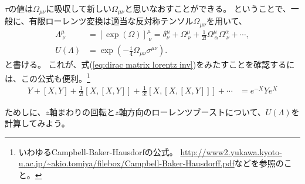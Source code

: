 \documentclass[10pt,a4paper]{jarticle}
\begin{document}
$\tau$の値は$\Omega_{\mu\nu}$に吸収して新しい$\Omega_{\mu\nu}$と思いなおすことができる。
ということで、一般に、有限ローレンツ変換は適当な反対称テンソル$\Omega_{\mu\nu}$を用いて、
\begin{align}
\Lambda^\mu_{~\nu} &= [\exp(\Omega)]^\mu_{~\nu} = \delta^\mu_\nu + \Omega^\mu_{~\nu} + \frac{1}{2!}\Omega^\mu_{~\alpha}\Omega^\alpha_{~\nu} + \cdots, \\
U(\Lambda) &= \exp\left( -\frac{i}{4} \Omega_{\mu\nu} \sigma^{\mu\nu} \right).
\end{align}
と書ける。
これが、式(\ref{eq:dirac matrix lorentz inv})をみたすことを確認するには、この公式も便利。\footnote{
いわゆるCampbell-Baker-Hausdorfの公式。
\url{http://www2.yukawa.kyoto-u.ac.jp/~akio.tomiya/filebox/Campbell-Baker-Hausdorff.pdf}などを参照のこと。
}
\begin{align}
Y + [X,Y] + \frac{1}{2!} [X,[X,Y]] + \frac{1}{3!} [X,[X,[X,Y]]] + \cdots &= e^{-X} Y e^X
\end{align}

ためしに、$z$軸まわりの回転と$z$軸方向のローレンツブーストについて、$U(\Lambda)$を計算してみよう。
\end{document}
